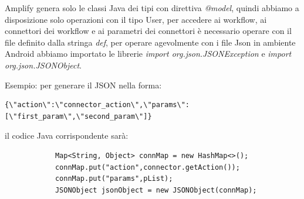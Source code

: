 Amplify genera solo le classi Java dei tipi con direttiva \textit{@model}, quindi abbiamo a disposizione solo operazioni con il tipo User, per accedere ai workflow, ai connettori dei workflow e ai parametri dei connettori è necessario operare con il file  definito dalla stringa \textit{def}, per operare agevolmente con i file Json in ambiente Android abbiamo importato le librerie \textit{import org.json.JSONException} e \textit{import org.json.JSONObject}.

Esempio: per generare il JSON nella forma:

\begin{verbatim}
{\"action\":\"connector_action\",\"params\":[\"first_param\",\"second_param\"]}
\end{verbatim}

il codice Java corrispondente sarà:

\begin{verbatim}
            Map<String, Object> connMap = new HashMap<>();
            connMap.put("action",connector.getAction());
            connMap.put("params",pList);
            JSONObject jsonObject = new JSONObject(connMap);
\end{verbatim}



